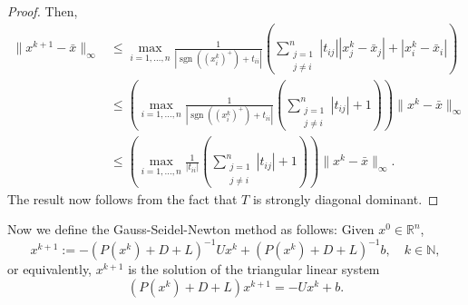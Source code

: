 \documentclass[11pt]{article}
\DeclareMathOperator{\sgn}{sgn}
\newcommand{\R}{\mathbb R}
\newcommand{\NN}{\mathbb{N}}
\begin{document}
\begin{proof}
Then,
\begin{align*}
\|x^{k+1}-\bar x\|_{\infty} &\leq \max_{i=1,\dots,n}\frac{1}{|\sgn((x^{k}_i)^+)+t_{ii}|}\left( \sum_{\substack{j=1 \\ j \neq i}}^n |t_{ij}||x^{k}_j-\bar x_j|+|x^{k}_i-\bar x_i| \right)\\
&\leq \left(\max_{i=1,\dots,n}\frac{1}{|\sgn((x^{k}_i)^+)+t_{ii}|}\left( \sum_{\substack{j=1 \\ j \neq i}}^n |t_{ij}|+1 \right)\right)\|x^{k}-\bar x\|_{\infty}\\
&\leq \left(\max_{i=1,\dots,n}\frac{1}{|t_{ii}|}\left( \sum_{\substack{j=1 \\ j \neq i}}^n |t_{ij}|+1 \right)\right)\|x^{k}-\bar x\|_{\infty}.
\end{align*}
The result now follows from the fact that $T$ is strongly diagonal dominant. 
\end{proof}

Now we define the Gauss-Seidel-Newton method as follows: Given $x^0\in\R^n$,
\begin{equation}\label{gs_newton}
x^{k+1} := -(P(x^{k})+D+L)^{-1}U x^{k} + (P(x^{k})+D+L)^{-1}b, \quad k\in\NN,\end{equation}
or equivalently, $x^{k+1}$ is the solution of the triangular linear system
\begin{equation}\label{gs_newton2}
(P(x^{k})+D+L)x^{k+1} = -U x^{k}+b.
\end{equation}

%
\end{document}
